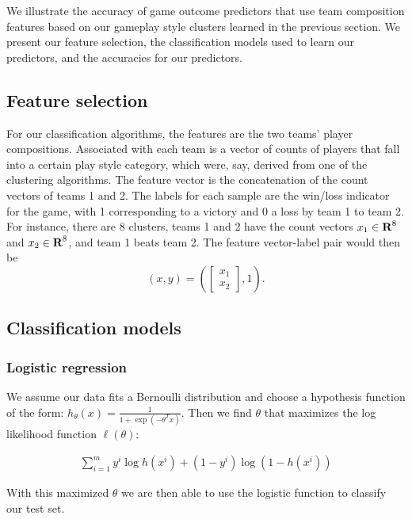 \documentclass[letterpaper,10 pt,conference]{ieeeconf}
\begin{document}
We illustrate the accuracy of game outcome predictors that use team composition features based on our gameplay style clusters learned in the previous section. We present our feature selection, the classification models used to learn our predictors, and the accuracies for our predictors. 

\subsection{Feature selection}

For our classification algorithms, the features are the two teams' player compositions. Associated with each team is a vector of counts of players that fall into a certain play style category, which were, say, derived from one of the clustering algorithms. The feature vector is the concatenation of the count vectors of teams 1 and 2. The labels for each sample are the win/loss indicator for the game, with 1 corresponding to a victory and 0 a loss by team 1 to team 2. For instance, there are 8 clusters, teams 1 and 2 have the count vectors $x_{1}\in{\mbox{\bf R}}^{8}$ and $x_{2}\in{\mbox{\bf R}}^{8}$, and team 1 beats team 2. The feature vector-label pair would then be 
\[
  \left(x, y\right) = 
  \left(
    \left[
      \begin{array}{c}
        x_{1} \\ 
        x_{2}
      \end{array}
    \right],
    1
  \right).
\]

\subsection{Classification models}

\subsubsection{Logistic regression} We assume our data fits a Bernoulli distribution and choose a hypothesis function of the form:  $h_{\theta}\left(x\right) = \frac{1}{1+\exp\left(-\theta^Tx\right)}$.  Then we find $\theta$ that maximizes the log likelihood function $\ell\left(\theta\right)$:

\begin{align}
\sum_{i = 1}^{m}  y^{i}\log h\left(x^{i}\right) + \left(1-y^{i}\right)\log\left(1-h\left(x^{i}\right)\right)
\label{eqn:logistic}
\end{align}

With this maximized $\theta$ we are then able to use the logistic function to classify our test set.
\end{document}
